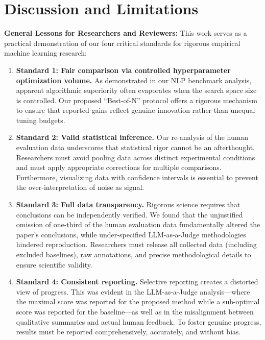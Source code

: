 \section{Discussion and Limitations}
\label{sec:discussion}


\textbf{General Lessons for Researchers and Reviewers: } This work serves as a practical demonstration of our four critical standards for rigorous empirical machine learning research:
%
\begin{enumerate}
    \item \textbf{Standard 1: Fair comparison via controlled hyperparameter optimization volume.} As demonstrated in our NLP benchmark analysis, apparent algorithmic superiority often evaporates when the search space size is controlled. Our proposed ``Best-of-N'' protocol offers a rigorous mechanism to ensure that reported gains reflect genuine innovation rather than unequal tuning budgets.

    \item \textbf{Standard 2: Valid statistical inference.} Our re-analysis of the human evaluation data underscores that statistical rigor cannot be an afterthought. Researchers must avoid pooling data across distinct experimental conditions and must apply appropriate corrections for multiple comparisons. Furthermore, visualizing data with confidence intervals is essential to prevent the over-interpretation of noise as signal.

    \item \textbf{Standard 3: Full data transparency.} Rigorous science requires that conclusions can be independently verified. We found that the unjustified omission of one-third of the human evaluation data fundamentally altered the paper's conclusions, while under-specified LLM-as-a-Judge methodologies hindered reproduction. Researchers must release all collected data (including excluded baselines), raw annotations, and precise methodological details to ensure scientific validity.

    \item \textbf{Standard 4: Consistent reporting.} Selective reporting creates a distorted view of progress. This was evident in the LLM-as-a-Judge analysis—where the maximal score was reported for the proposed method while a sub-optimal score was reported for the baseline—as well as in the misalignment between qualitative summaries and actual human feedback. To foster genuine progress, results must be reported comprehensively, accurately, and without bias.
\end{enumerate}

